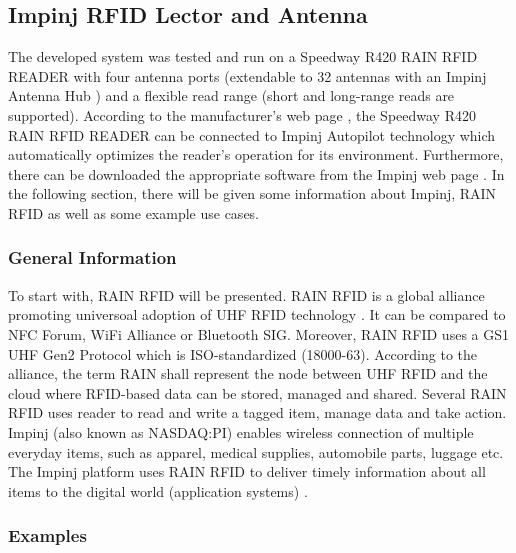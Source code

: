 \subsection{Impinj RFID Lector and Antenna}

The developed system was tested and run on a Speedway R420 RAIN RFID READER \cite{speedway} with four antenna ports (extendable to 32 antennas with an Impinj Antenna Hub \cite{speedway}) and a flexible read range (short and long-range reads are supported). According to the manufacturer's web page \cite{speedway}, the Speedway R420 RAIN RFID READER can be connected to Impinj Autopilot technology which automatically optimizes the reader's operation for its environment. Furthermore, there can be downloaded the appropriate software from the Impinj web page \cite{speedway}.
In the following section, there will be given some information about Impinj, RAIN RFID as well as some example use cases. 

\subsubsection{General Information}

To start with, \ac{RAIN} RFID will be presented. RAIN RFID is a global alliance promoting universoal adoption of UHF RFID technology \cite{rainrfid}. It can be compared to NFC Forum, WiFi Alliance or Bluetooth SIG. Moreover, RAIN RFID uses a GS1 UHF Gen2 Protocol which is ISO-standardized (18000-63). According to the alliance, the term RAIN shall represent the node between UHF RFID and the cloud where RFID-based data can be stored, managed and shared. Several RAIN RFID uses reader to read and write a tagged item, manage data and take action.
Impinj (also known as NASDAQ:PI) enables wireless connection of multiple everyday items, such as apparel, medical supplies, automobile parts, luggage etc. The Impinj platform uses RAIN RFID to deliver timely information about all items to the digital world (application systems) \cite{impinj}.

\subsubsection{Examples}

